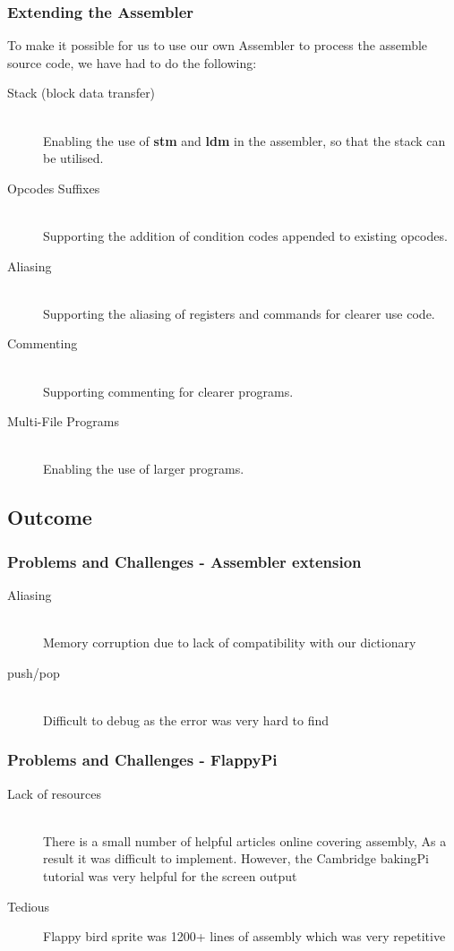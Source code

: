 \documentclass{beamer}
\begin{document}
\begin{frame}
\frametitle{Extending the Assembler}
To make it possible for us to use our own Assembler to process the assemble source code, we have had to do the following:
\begin{description}

\item[Stack (block data transfer)]\hfill\\
	\small Enabling the use of \textbf{stm} and \textbf{ldm} in the assembler, so that the stack can be utilised.
	
\item[Opcodes Suffixes]\hfill\\
	Supporting the addition of condition codes appended to existing opcodes.

\item[Aliasing]\hfill\\
	Supporting the aliasing of registers and commands for clearer use code.
		
\item[Commenting]\hfill\\
	Supporting commenting for clearer programs.

\item[Multi-File Programs]\hfill\\
	Enabling the use of larger programs.

\end{description}
\end{frame}
\subsection{Outcome}

\begin{frame}
\frametitle{Problems and Challenges - Assembler extension}
\begin{description}
\item[Aliasing]\hfill\\
	Memory corruption due to lack of compatibility with our dictionary
\item[push/pop]\hfill\\
	Difficult to debug as the error was very hard to find
\end{description}
\end{frame}

\begin{frame}
\frametitle{Problems and Challenges - FlappyPi}
\begin{description}
\item[Lack of resources]\hfill\\
There is a small number of helpful articles online covering assembly,
As a result it was difficult to implement.
However, the Cambridge bakingPi tutorial was very helpful for the screen output
\item[Tedious]
Flappy bird sprite was 1200+ lines of assembly which was very repetitive
\end{description}
\end{frame}
\end{document}
